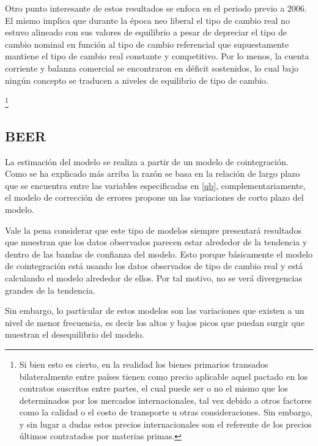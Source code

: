 \documentclass[12pt,letterpaper]{article}
\begin{document}
Otro punto interesante de estos resultados se enfoca en el periodo previo a 2006. El mismo implica que durante la época neo liberal el tipo de cambio real no estuvo alineado con sus valores de equilibrio a pesar de depreciar el tipo de cambio nominal en función al tipo de cambio referencial que supuestamente  mantiene el tipo de cambio real constante y competitivo. Por lo menos, la cuenta corriente y balanza comercial se encontraron en déficit sostenidos, lo cual bajo ningún concepto se traducen a niveles de equilibrio de tipo de cambio.

\footnote{Si bien esto es cierto, en la realidad los bienes primarios transados bilateralmente entre países tienen como precio aplicable aquel pactado en los contratos suscritos entre partes, el cual puede ser o no el mismo que los determinados por los mercados internacionales, tal vez debido a otros factores como la calidad o el costo de transporte u otras consideraciones. Sin embargo, y sin lugar a dudas estos precios internacionales son el referente de los precios últimos contratados por materias primas.}	






\subsection{BEER}
La estimación del modelo se realiza a partir de un modelo de cointegración. Como se ha explicado más arriba la razón se basa en la relación de largo plazo que se encuentra entre las variables especificadas en \ref{qb}, complementariamente, el modelo de corrección de errores propone un las variaciones de corto plazo del modelo.

Vale la pena considerar que este tipo de modelos siempre presentará resultados que muestran que los datos observados parecen estar alrededor de la tendencia y dentro de las bandas de confianza del modelo. Esto porque básicamente el modelo de cointegración está usando los datos observados de tipo de cambio real y está calculando el modelo alrededor de ellos. Por tal motivo, no se verá divergencias grandes de la tendencia.

Sin embargo, lo particular de estos modelos son las variaciones que existen a un nivel de menor frecuencia, es decir los altos y bajos picos que puedan surgir que muestran el desequilibrio del modelo.
\end{document}
